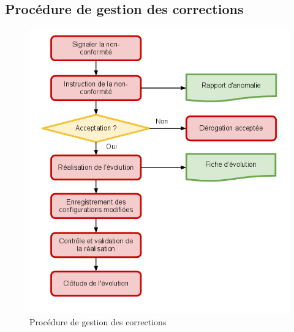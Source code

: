\documentclass{mise_en_page}
\begin{document}
\subsection{Procédure de gestion des corrections}

\begin{figure}[H]
	\centering
	\includegraphics[width=150mm]{correction.png}
	\caption{\label{evol} Procédure de gestion des corrections}
\end{figure}
\end{document}

